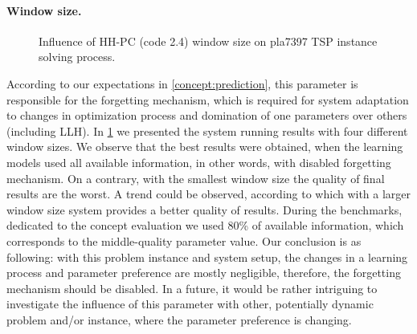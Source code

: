 \paragraph{Window size.}
\begin{figure}[h]
	\centering
	\vspace{-20pt}
	
	\caption{Influence of HH-PC (code 2.4) window size on pla7397 TSP instance solving process.}
	\vspace{-5pt}
	\label{eval:2:pict:window size}
\end{figure}
According to our expectations in \cref{concept:prediction}, this parameter is responsible for the forgetting mechanism, which is required for system adaptation to changes in optimization process and domination of one parameters over others (including LLH).
In \cref{eval:2:pict:window size} we presented the system running results with four different window sizes. We observe that the best results were obtained, when the learning models used all available information, in other words, with disabled forgetting mechanism. On a contrary, with the smallest window size the quality of final results are the worst. A trend could be observed, according to which with a larger window size system provides a better quality of results. During the benchmarks, dedicated to the concept evaluation we used 80\% of available information, which corresponds to the middle-quality parameter value.
Our conclusion is as following: with this problem instance and system setup, the changes in a learning process and parameter preference are mostly negligible, therefore, the forgetting mechanism should be disabled.
In a future, it would be rather intriguing to investigate the influence of this parameter with other, potentially dynamic problem and/or instance, where the parameter preference is changing.

